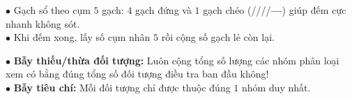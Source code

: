 \documentclass[14pt,a4paper,oneside]{extbook}
\begin{document}
\noindent
\begin{minipage}[t]{0.54\textwidth}
  \begin{tcolorbox}[
    enhanced,
    title={\footnotesize\bfseries\color{white}\faCheckSquareO\ Phương pháp gạch sổ cụm 5 kiểm đếm},
    colback=green!3!white,
    colframe=green!60!black,
    arc=2.5mm, boxrule=0.8pt, top=1.8mm, bottom=1.8mm, left=2.2mm, right=2.2mm
  ]
    \footnotesize
    $\bullet$ Gạch sổ theo cụm $5$ gạch: $4$ gạch đứng và $1$ gạch chéo (\textsf{/\!/\!/\!/}\hspace{-6pt}\textbf{---}) giúp đếm cực nhanh không sót.\\
    $\bullet$ Khi đếm xong, lấy số cụm nhân $5$ rồi cộng số gạch lẻ còn lại.
  \end{tcolorbox}
\end{minipage}%
\hfill
\begin{minipage}[t]{0.44\textwidth}
  \begin{tcolorbox}[
    enhanced,
    title={\footnotesize\bfseries\color{white}\faExclamationTriangle\ Mẹo tránh bẫy trắc nghiệm},
    colback=red!2!white,
    colframe=red!70!black,
    arc=2.5mm, boxrule=0.8pt, top=1.8mm, bottom=1.8mm, left=2.2mm, right=2.2mm
  ]
    \footnotesize
    $\bullet$ \textbf{Bẫy thiếu/thừa đối tượng:} Luôn cộng tổng số lượng các nhóm phân loại xem có bằng đúng tổng số đối tượng điều tra ban đầu không!\\
    $\bullet$ \textbf{Bẫy tiêu chí:} Mỗi đối tượng chỉ được thuộc đúng $1$ nhóm duy nhất.
  \end{tcolorbox}
\end{minipage}
\end{document}
